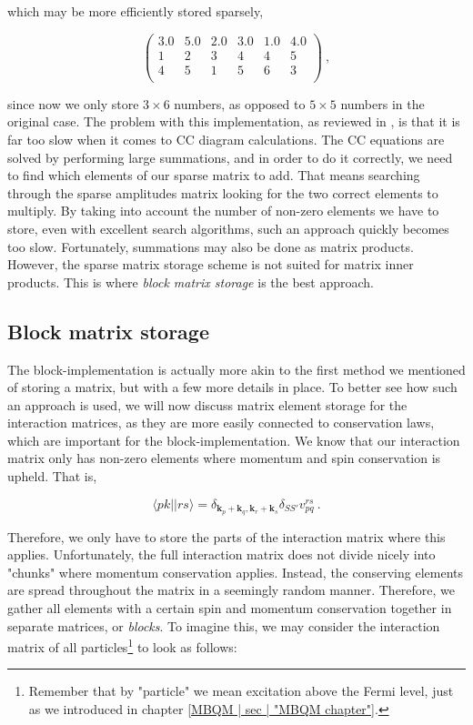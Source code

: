 \documentclass[10pt,twoside]{report}
\begin{document}
	\noindent which may be more efficiently stored sparsely,
	
	\begin{equation*}
		\begin{pmatrix}
			3.0 & 5.0 & 2.0 & 3.0 & 1.0 & 4.0 \\
			1 & 2 & 3 & 4 & 4 & 5 \\
			4 & 5 & 1 & 5 & 6 & 3 \\
		\end{pmatrix} \:,
	\end{equation*}
	
	\noindent since now we only store $3\times6$ numbers, as opposed to $5\times5$ numbers in the original case. The problem with this implementation, as reviewed in \cite{Hansen15}, is that it is far too slow when it comes to CC diagram calculations. The CC equations are solved by performing large summations, and in order to do it correctly, we need to find which elements of our sparse matrix to add. That means searching through the sparse amplitudes matrix looking for the two correct elements to multiply. By taking into account the number of non-zero elements we have to store, even with excellent search algorithms, such an approach quickly becomes too slow. Fortunately, summations may also be done as matrix products. However, the sparse matrix storage scheme is not suited for matrix inner products. This is where \emph{block matrix storage} is the best approach.
	
	\subsection{Block matrix storage}
	The block-implementation is actually more akin to the first method we mentioned of storing a matrix, but with a few more details in place. To better see how such an approach is used, we will now discuss matrix element storage for the interaction matrices, as they are more easily connected to conservation laws, which are important for the block-implementation. We know that our interaction matrix only has non-zero elements where momentum and spin conservation is upheld. That is,
	
	\begin{equation}
		\langle pk||rs\rangle = \delta_{\bm{k}_p + \bm{k}_q,\bm{k}_r + \bm{k}_s}\delta_{SS'} v_{pq}^{rs}\:.
	\end{equation}
	
	Therefore, we only have to store the parts of the interaction matrix where this applies. Unfortunately, the full interaction matrix does not divide nicely into "chunks" where momentum conservation applies. Instead, the conserving elements are spread throughout the matrix in a seemingly random manner. Therefore, we gather all elements with a certain spin and momentum conservation together in separate matrices, or \emph{blocks}. To imagine this, we may consider the interaction matrix of all particles\footnote{Remember that by "particle" we mean excitation above the Fermi level, just as we introduced in chapter \ref{MBQM | sec | "MBQM chapter"}.} to look as follows:
	
\end{document}
